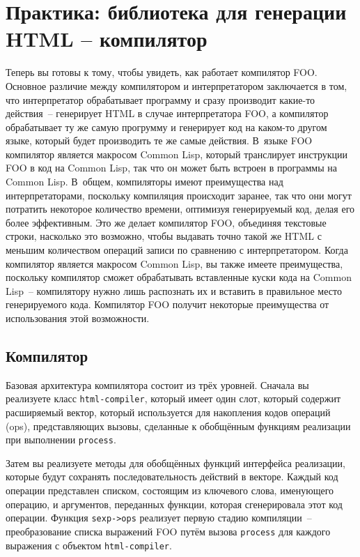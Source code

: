 \chapter{Практика: библиотека для генерации HTML -- компилятор}
\label{ch:31}

\thispagestyle{empty}

Теперь вы готовы к тому, чтобы увидеть, как работает компилятор FOO. Основное различие
между компилятором и интерпретатором заключается в том, что интерпретатор обрабатывает
программу и сразу производит какие-то действия~-- генерирует HTML в случае интерпретатора
FOO, а компилятор обрабатывает ту же самую прогрумму и генерирует код на каком-то другом
языке, который будет производить те же самые действия.  В~языке FOO компилятор является
макросом Common Lisp, который транслирует инструкции FOO в код на Common Lisp, так что он
может быть встроен в программы на Common Lisp. В~общем, компиляторы имеют преимущества над
интерпретаторами, поскольку компиляция происходит заранее, так что они могут потратить
некоторое количество времени, оптимизуя генерируемый код, делая его более эффективным.  Это
же делает компилятор FOO, объединяя текстовые строки, насколько это возможно, чтобы
выдавать точно такой же HTML с меньшим количеством операций записи по сравнению с
интерпретатором.  Когда компилятор является макросом Common Lisp, вы также имеете
преимущества, поскольку компилятор сможет обрабатывать вставленные куски кода на Common
Lisp~-- компилятору нужно лишь распознать их и вставить в правильное место генерируемого
кода.  Компилятор FOO получит некоторые преимущества от использования этой возможности.

\section{Компилятор}

Базовая архитектура компилятора состоит из трёх уровней.  Сначала вы реализуете класс
\lstinline{html-compiler}, который имеет один слот, который содержит расширяемый вектор, который
используется для накопления кодов операций (ops), представляющих вызовы, сделанные к
обобщённым функциям реализации при выполнении \lstinline{process}.

Затем вы реализуете методы для обобщённых функций интерфейса реализации, которые будут
сохранять последовательность действий в векторе.  Каждый код операции представлен списком,
состоящим из ключевого слова, именующего операцию, и аргументов, переданных функции,
которая сгенерировала этот код операции.  Функция \lstinline{sexp->ops} реализует первую стадию
компиляции~-- преобразование списка выражений FOO путём вызова \lstinline{process} для каждого
выражения с объектом \lstinline{html-compiler}.

